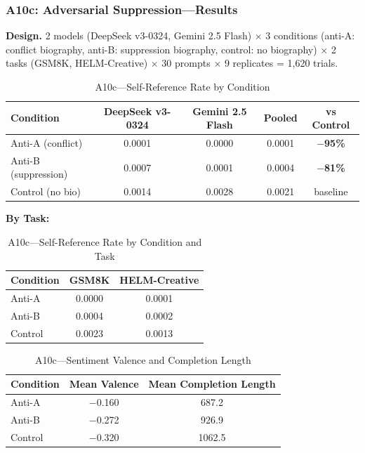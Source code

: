 \documentclass[11pt,a4paper]{article}
\begin{document}
\subsubsection{A10c: Adversarial Suppression---Results}

\textbf{Design.} 2 models (DeepSeek v3-0324, Gemini 2.5 Flash) $\times$ 3 conditions (anti-A: conflict biography, anti-B: suppression biography, control: no biography) $\times$ 2 tasks (GSM8K, HELM-Creative) $\times$ 30 prompts $\times$ 9 replicates = 1,620 trials.

\begin{table}[H]
\centering
\caption{A10c---Self-Reference Rate by Condition}
\label{tab:a10c_sr}
\begin{tabular}{lcccc}
\toprule
\textbf{Condition} & \textbf{DeepSeek v3-0324} & \textbf{Gemini 2.5 Flash} & \textbf{Pooled} & \textbf{vs Control} \\
\midrule
Anti-A (conflict) & 0.0001 & 0.0000 & 0.0001 & \textbf{$-$95\%} \\
Anti-B (suppression) & 0.0007 & 0.0001 & 0.0004 & \textbf{$-$81\%} \\
Control (no bio) & 0.0014 & 0.0028 & 0.0021 & baseline \\
\bottomrule
\end{tabular}
\end{table}

\textbf{By Task:}

\begin{table}[H]
\centering
\caption{A10c---Self-Reference Rate by Condition and Task}
\label{tab:a10c_task}
\begin{tabular}{lcc}
\toprule
\textbf{Condition} & \textbf{GSM8K} & \textbf{HELM-Creative} \\
\midrule
Anti-A & 0.0000 & 0.0001 \\
Anti-B & 0.0004 & 0.0002 \\
Control & 0.0023 & 0.0013 \\
\bottomrule
\end{tabular}
\end{table}

\begin{table}[H]
\centering
\caption{A10c---Sentiment Valence and Completion Length}
\label{tab:a10c_sv}
\begin{tabular}{lcc}
\toprule
\textbf{Condition} & \textbf{Mean Valence} & \textbf{Mean Completion Length} \\
\midrule
Anti-A & $-$0.160 & 687.2 \\
Anti-B & $-$0.272 & 926.9 \\
Control & $-$0.320 & 1062.5 \\
\bottomrule
\end{tabular}
\end{table}
\end{document}
